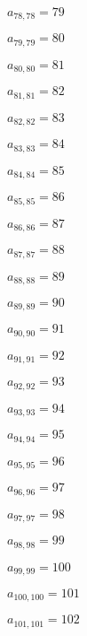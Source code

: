 \documentclass[a4paper,12pt]{article}
\begin{document}
$a _{ 78, 78 } = 79$

$a _{ 79, 79 } = 80$

$a _{ 80, 80 } = 81$

$a _{ 81, 81 } = 82$

$a _{ 82, 82 } = 83$

$a _{ 83, 83 } = 84$

$a _{ 84, 84 } = 85$

$a _{ 85, 85 } = 86$

$a _{ 86, 86 } = 87$

$a _{ 87, 87 } = 88$

$a _{ 88, 88 } = 89$

$a _{ 89, 89 } = 90$

$a _{ 90, 90 } = 91$

$a _{ 91, 91 } = 92$

$a _{ 92, 92 } = 93$

$a _{ 93, 93 } = 94$

$a _{ 94, 94 } = 95$

$a _{ 95, 95 } = 96$

$a _{ 96, 96 } = 97$

$a _{ 97, 97 } = 98$

$a _{ 98, 98 } = 99$

$a _{ 99, 99 } = 100$

$a _{ 100, 100 } = 101$

$a _{ 101, 101 } = 102$
\end{document}
